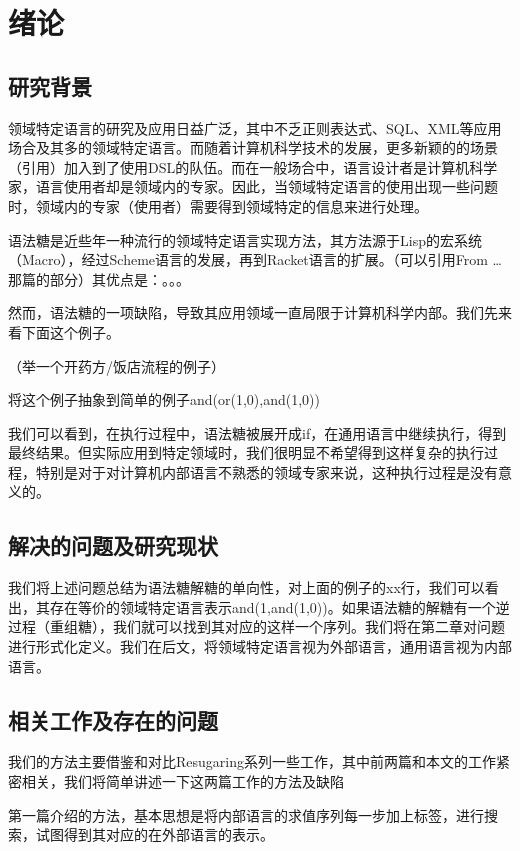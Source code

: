 \pagestyle{fancy}
\normalsize
\linespread{1.5}\selectfont
\chapter{绪论}

\section{研究背景}
领域特定语言的研究及应用日益广泛，其中不乏正则表达式、SQL、XML等应用场合及其多的领域特定语言。而随着计算机科学技术的发展，更多新颖的的场景（引用）加入到了使用DSL的队伍。而在一般场合中，语言设计者是计算机科学家，语言使用者却是领域内的专家。因此，当领域特定语言的使用出现一些问题时，领域内的专家（使用者）需要得到领域特定的信息来进行处理。

语法糖是近些年一种流行的领域特定语言实现方法，其方法源于Lisp的宏系统（Macro），经过Scheme语言的发展，再到Racket语言的扩展。（可以引用From …那篇的部分）其优点是：。。。

然而，语法糖的一项缺陷，导致其应用领域一直局限于计算机科学内部。我们先来看下面这个例子。

（举一个开药方/饭店流程的例子）

将这个例子抽象到简单的例子and(or(1,0),and(1,0))

我们可以看到，在执行过程中，语法糖被展开成if，在通用语言中继续执行，得到最终结果。但实际应用到特定领域时，我们很明显不希望得到这样复杂的执行过程，特别是对于对计算机内部语言不熟悉的领域专家来说，这种执行过程是没有意义的。

\section{解决的问题及研究现状}
我们将上述问题总结为语法糖解糖的单向性，对上面的例子的xx行，我们可以看出，其存在等价的领域特定语言表示and(1,and(1,0))。如果语法糖的解糖有一个逆过程（重组糖），我们就可以找到其对应的这样一个序列。我们将在第二章对问题进行形式化定义。我们在后文，将领域特定语言视为外部语言，通用语言视为内部语言。

\section{相关工作及存在的问题}
我们的方法主要借鉴和对比Resugaring系列一些工作，其中前两篇和本文的工作紧密相关，我们将简单讲述一下这两篇工作的方法及缺陷

第一篇介绍的方法，基本思想是将内部语言的求值序列每一步加上标签，进行搜索，试图得到其对应的在外部语言的表示。

